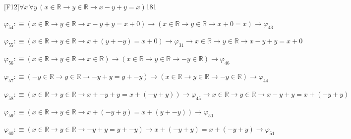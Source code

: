 \begin{fullproof}{[F12]}{$\forall x\,\forall y\,(x \in \mathbb{R} \to y \in \mathbb{R} \to x - y + y = x)$}{181}
\begin{abbrevlist}
\item $\varphi_{54} :\equiv (x \in \mathbb{R} \to y \in \mathbb{R} \to x - y + y = x + 0) \to (x \in \mathbb{R} \to y \in \mathbb{R} \to x + 0 = x) \to \varphi_{43}$
\item $\varphi_{55} :\equiv (x \in \mathbb{R} \to y \in \mathbb{R} \to x + (y + -y) = x + 0) \to \varphi_{31} \to x \in \mathbb{R} \to y \in \mathbb{R} \to x - y + y = x + 0$
\item $\varphi_{56} :\equiv (x \in \mathbb{R} \to y \in \mathbb{R} \to x \in \mathbb{R}) \to (x \in \mathbb{R} \to y \in \mathbb{R} \to -y \in \mathbb{R}) \to \varphi_{46}$
\item $\varphi_{57} :\equiv (-y \in \mathbb{R} \to y \in \mathbb{R} \to -y + y = y + -y) \to (x \in \mathbb{R} \to y \in \mathbb{R} \to -y \in \mathbb{R}) \to \varphi_{44}$
\item $\varphi_{58} :\equiv (x \in \mathbb{R} \to y \in \mathbb{R} \to x + -y + y = x + (-y + y)) \to \varphi_{45} \to x \in \mathbb{R} \to y \in \mathbb{R} \to x - y + y = x + (-y + y)$
\item $\varphi_{59} :\equiv (x \in \mathbb{R} \to y \in \mathbb{R} \to x + (-y + y) = x + (y + -y)) \to \varphi_{50}$
\item $\varphi_{60} :\equiv (x \in \mathbb{R} \to y \in \mathbb{R} \to -y + y = y + -y) \to x + (-y + y) = x + (-y + y) \to \varphi_{51}$
\end{abbrevlist}
\end{fullproof}
